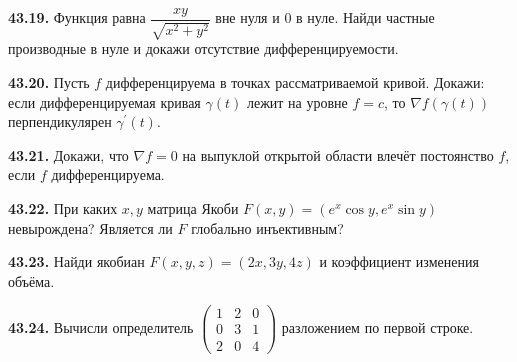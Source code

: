\noindent\begin{minipage}[t]{\linewidth}\textbf{43.19.}\starmark{} Функция равна \(\dfrac{xy}{\sqrt{x^2+y^2}}\) вне нуля и \(0\) в нуле. Найди частные производные в нуле и докажи отсутствие дифференцируемости.\par\end{minipage}\par
\noindent\begin{minipage}[t]{\linewidth}\textbf{43.20.}\starmark{} Пусть \(f\) дифференцируема в точках рассматриваемой кривой. Докажи: если дифференцируемая кривая \(\gamma(t)\) лежит на уровне \(f=c\), то \(\nabla f(\gamma(t))\) перпендикулярен \(\gamma^{\prime}(t)\).\par\end{minipage}\par
\noindent\begin{minipage}[t]{\linewidth}\textbf{43.21.}\starmark{} Докажи, что \(\nabla f=0\) на выпуклой открытой области влечёт постоянство \(f\), если \(f\) дифференцируема.\par\end{minipage}\par
\noindent\begin{minipage}[t]{\linewidth}\textbf{43.22.}\starmark{} При каких \(x,y\) матрица Якоби \(F(x,y)=(e^x\cos y,e^x\sin y)\) невырождена? Является ли \(F\) глобально инъективным?\par\end{minipage}\par
\noindent\begin{minipage}[t]{\linewidth}\textbf{43.23.} Найди якобиан \(F(x,y,z)=(2x,3y,4z)\) и коэффициент изменения объёма.\par\end{minipage}\par
\noindent\begin{minipage}[t]{\linewidth}\textbf{43.24.} Вычисли определитель \(\begin{pmatrix}1&2&0\\0&3&1\\2&0&4\end{pmatrix}\) разложением по первой строке.\par\end{minipage}\par
\endgroup
